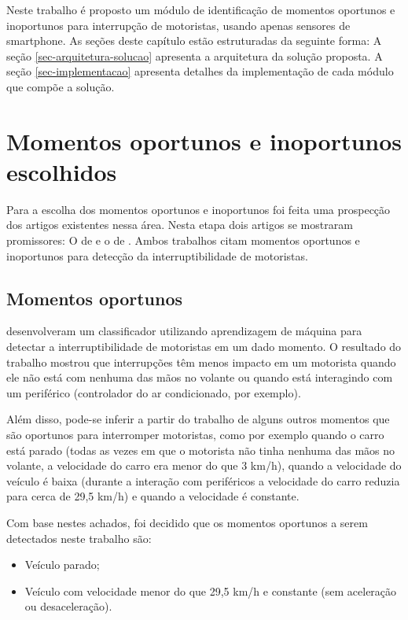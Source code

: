 \label{proposta}

Neste trabalho é proposto um módulo de identificação de momentos oportunos e inoportunos para interrupção de
motoristas, usando apenas sensores de smartphone. As seções deste capítulo estão estruturadas da seguinte forma:
A seção \ref{sec-arquitetura-solucao} apresenta a arquitetura da solução proposta. A seção \ref{sec-implementacao}
apresenta detalhes da implementação de cada módulo que compõe a solução.

\section{Momentos oportunos e inoportunos escolhidos}
\label{sec-momentos-oportunos-inoportunos}

Para a escolha dos momentos oportunos e inoportunos foi feita uma prospecção dos artigos existentes nessa área.
Nesta etapa dois artigos se mostraram promissores: O de  e o de .
Ambos trabalhos citam momentos oportunos e inoportunos para detecção da interruptibilidade de motoristas.

\subsection{Momentos oportunos}
\label{subsec-momentos-oportunos}

 desenvolveram um classificador utilizando aprendizagem de máquina para detectar a interruptibilidade
de motoristas em um dado momento. O resultado do trabalho mostrou que interrupções têm menos impacto em um motorista quando ele
não está com nenhuma das mãos no volante ou quando está interagindo com um periférico (controlador do ar condicionado, por exemplo).

Além disso, pode-se inferir a partir do trabalho de  alguns outros momentos que são oportunos para
interromper motoristas, como por exemplo quando o carro está parado (todas as vezes em que o motorista não tinha nenhuma das
mãos no volante, a velocidade do carro era menor do que 3 km/h), quando a velocidade do veículo é baixa (durante a interação com
periféricos a velocidade do carro reduzia para cerca de 29,5 km/h) e quando a velocidade é constante.

Com base nestes achados, foi decidido que os momentos oportunos a serem detectados neste trabalho são:

\begin{itemize}
  \item Veículo parado;
  \item Veículo com velocidade menor do que 29,5 km/h e constante (sem aceleração ou desaceleração).
\end{itemize}

